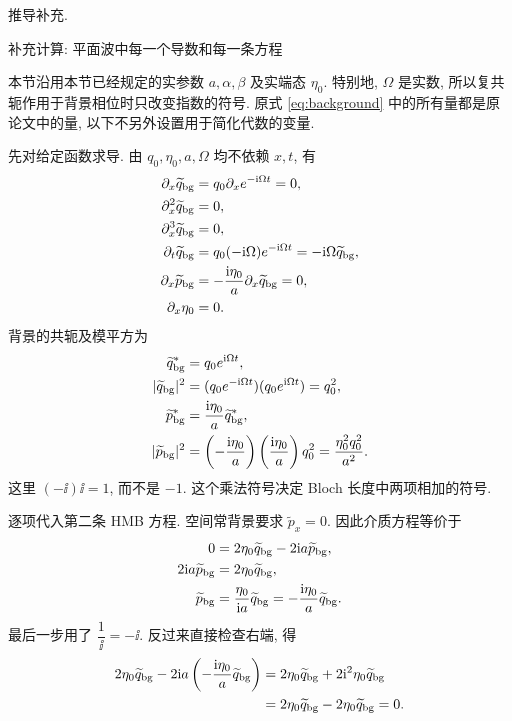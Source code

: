 \par\medskip\noindent 推导补充.\par
\par\medskip\noindent 补充计算: 平面波中每一个导数和每一条方程\par
本节沿用本节已经规定的实参数 $a,\alpha,\beta$ 及实端态 $\eta_0$. 特别地, $\Omega$ 是实数, 所以复共轭作用于背景相位时只改变指数的符号. 原式 \eqref{eq:background} 中的所有量都是原论文中的量, 以下不另外设置用于简化代数的变量.
\par\smallskip\noindent 先对给定函数求导.\quad
由 $q_0,\eta_0,a,\Omega$ 均不依赖 $x,t$, 有
\begin{align*}
\partial_x\widetilde q_{\rm bg}
&=q_0\partial_x e^{-\mathrm{i}\Omega t}=0,\\
\partial_x^2\widetilde q_{\rm bg}&=0,\\
\partial_x^3\widetilde q_{\rm bg}&=0,\\
\partial_t\widetilde q_{\rm bg}
&=q_0(-\mathrm{i}\Omega)e^{-\mathrm{i}\Omega t}
=-\mathrm{i}\Omega\widetilde q_{\rm bg},\\
\partial_x\widetilde p_{\rm bg}
&=-\dfrac{\mathrm{i}\eta_0}{a}\partial_x\widetilde q_{\rm bg}=0,\\
\partial_x\eta_0&=0.
\end{align*}
背景的共轭及模平方为
\begin{align*}
{\widetilde q_{\rm bg}}^{*}
&=q_0e^{\mathrm{i}\Omega t},\\
|\widetilde q_{\rm bg}|^2
&=(q_0e^{-\mathrm{i}\Omega t})(q_0e^{\mathrm{i}\Omega t})=q_0^2,\\
{\widetilde p_{\rm bg}}^{*}
&=\dfrac{\mathrm{i}\eta_0}{a}{\widetilde q_{\rm bg}}^{*},\\
|\widetilde p_{\rm bg}|^2
&=\left(-\dfrac{\mathrm{i}\eta_0}{a}\right)
\left(\dfrac{\mathrm{i}\eta_0}{a}\right)q_0^2
=\dfrac{\eta_0^2q_0^2}{a^2}.
\end{align*}
这里 $(-\ii)\ii=1$, 而不是 $-1$. 这个乘法符号决定 Bloch 长度中两项相加的符号.
\par\smallskip\noindent 逐项代入第二条 HMB 方程.\quad
空间常背景要求 $\widetilde p_x=0$. 因此介质方程等价于
\begin{align*}
0&=2\eta_0\widetilde q_{\rm bg}-2\mathrm{i} a\widetilde p_{\rm bg},\\
2\mathrm{i} a\widetilde p_{\rm bg}
&=2\eta_0\widetilde q_{\rm bg},\\
\widetilde p_{\rm bg}
&=\dfrac{\eta_0}{\mathrm{i} a}\widetilde q_{\rm bg}
=-\dfrac{\mathrm{i}\eta_0}{a}\widetilde q_{\rm bg}.
\end{align*}
最后一步用了 $\dfrac{1}{\ii}=-\ii$. 反过来直接检查右端, 得
\begin{align*}
2\eta_0\widetilde q_{\rm bg}
-2\mathrm{i} a\left(-\dfrac{\mathrm{i}\eta_0}{a}\widetilde q_{\rm bg}\right)
&=2\eta_0\widetilde q_{\rm bg}
+2\mathrm{i}^2\eta_0\widetilde q_{\rm bg}\\
&=2\eta_0\widetilde q_{\rm bg}-2\eta_0\widetilde q_{\rm bg}=0.
\end{align*}
